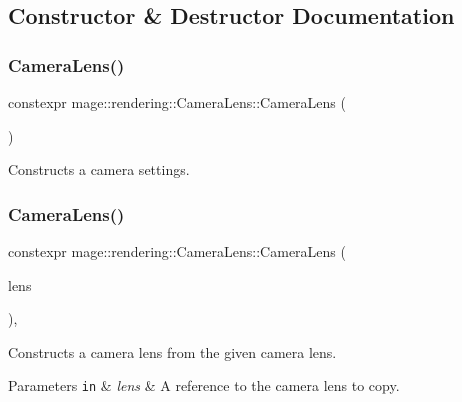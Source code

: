 \subsection{Constructor \& Destructor Documentation}
\hypertarget{classmage_1_1rendering_1_1_camera_lens_aa17be03069e7150aaaaa12cd2bd161fc}{}\label{classmage_1_1rendering_1_1_camera_lens_aa17be03069e7150aaaaa12cd2bd161fc} 
\subsubsection{\texorpdfstring{Camera\+Lens()}{CameraLens()}\hspace{0.1cm}{\footnotesize\ttfamily [1/3]}}
{\footnotesize\ttfamily constexpr mage\+::rendering\+::\+Camera\+Lens\+::\+Camera\+Lens (\begin{DoxyParamCaption}{ }\end{DoxyParamCaption})\hspace{0.3cm}{\ttfamily [noexcept]}}

Constructs a camera settings. \hypertarget{classmage_1_1rendering_1_1_camera_lens_a69c6788001ad02b1ee229d530ded8fe0}{}\label{classmage_1_1rendering_1_1_camera_lens_a69c6788001ad02b1ee229d530ded8fe0} 
\subsubsection{\texorpdfstring{Camera\+Lens()}{CameraLens()}\hspace{0.1cm}{\footnotesize\ttfamily [2/3]}}
{\footnotesize\ttfamily constexpr mage\+::rendering\+::\+Camera\+Lens\+::\+Camera\+Lens (\begin{DoxyParamCaption}\item[{const \hyperlink{classmage_1_1rendering_1_1_camera_lens}{Camera\+Lens} \&}]{lens }\end{DoxyParamCaption})\hspace{0.3cm}{\ttfamily [default]}, {\ttfamily [noexcept]}}

Constructs a camera lens from the given camera lens.


\begin{DoxyParams}[1]{Parameters}
\mbox{\tt in}  & {\em lens} & A reference to the camera lens to copy. \\
\hline
\end{DoxyParams}
\hypertarget{classmage_1_1rendering_1_1_camera_lens_a59311c60fc8625a38c04edbb97e23179}{}\label{classmage_1_1rendering_1_1_camera_lens_a59311c60fc8625a38c04edbb97e23179} 
